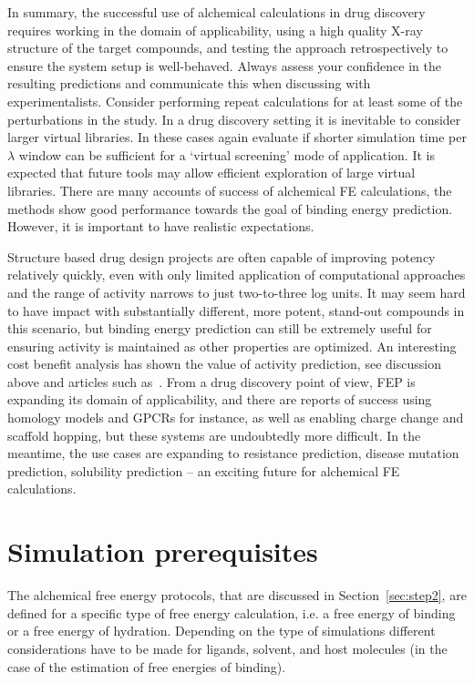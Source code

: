 \documentclass[9pt,bestpractices]{livecoms}
\begin{document}
In summary, the successful use of alchemical calculations in drug discovery requires working in the domain of applicability, using a high quality X-ray structure of the target compounds, and testing the approach retrospectively to ensure the system setup is well-behaved. Always assess your confidence in the resulting predictions and communicate this when discussing with experimentalists. Consider performing repeat calculations for at least some of the perturbations in the study. In a drug discovery setting it is inevitable to consider larger virtual libraries. In these cases again evaluate if shorter simulation time per $\lambda$ window can be sufficient for a ‘virtual screening’ mode of application. It is expected that future tools may allow efficient exploration of large virtual libraries. There are many accounts of success of alchemical FE calculations, the methods show good performance towards the goal of binding energy prediction. However, it is important to have realistic expectations. 

Structure based drug design projects are often capable of improving potency relatively quickly, even with only limited application of computational approaches and the range of activity narrows to just two-to-three log units. It may seem hard to have impact with substantially different, more potent, stand-out compounds in this scenario, but binding energy prediction can still be extremely useful for ensuring activity is maintained as other properties are optimized. An interesting cost benefit analysis has shown the value of activity prediction, see discussion above and articles such as~\cite{mobley2012perspectiv}. From a drug discovery point of view, FEP is expanding its domain of applicability, and there are reports of success using homology models and GPCRs for instance, as well as enabling charge change and scaffold hopping, but these systems are undoubtedly more difficult.  In the meantime, the use cases are expanding to resistance prediction, disease mutation prediction, solubility prediction – an exciting future for alchemical FE calculations. 
%
%
%
%
\section{Simulation prerequisites}
\label{sec:step1}
%
The alchemical free energy protocols, that are discussed in Section~\ref{sec:step2}, are defined for a specific type of free energy calculation, i.e. a free energy of binding or a free energy of hydration. Depending on the type of simulations different considerations have to be made for ligands, solvent, and host molecules (in the case of the estimation of free energies of binding).
\end{document}
